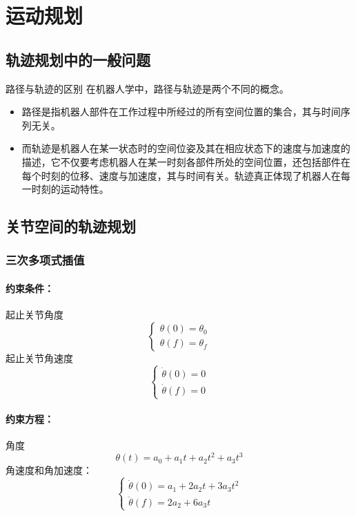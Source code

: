 \chapter{运动规划}
\label{sec:06-motion-planning}

\section{轨迹规划中的一般问题}
路径与轨迹的区别
在机器人学中，路径与轨迹是两个不同的概念。
\begin{itemize}
    \item 路径是指机器人部件在工作过程中所经过的所有空间位置的集合，其与时间序列无关。
    \item 而轨迹是机器人在某一状态时的空间位姿及其在相应状态下的速度与加速度的描述，它不仅要考虑机器人在某一时刻各部件所处的空间位置，还包括部件在每个时刻的位移、速度与加速度，其与时间有关。轨迹真正体现了机器人在每一时刻的运动特性。
\end{itemize}

\section{关节空间的轨迹规划}
\subsection{三次多项式插值}

\subsubsection{约束条件：}
起止关节角度
$$
\begin{cases} 
\theta(0) = \theta_0 \\ 
\theta(f) = \theta_f 
\end{cases}
$$
起止关节角速度
$$
\begin{cases} 
\dot{\theta}(0) = 0 \\ 
\dot{\theta}(f) = 0
\end{cases}
$$

\subsubsection{约束方程：}
角度
$$
\theta(t) = a_0 + a_1t + a_2t^2 + a_3t^3
$$
角速度和角加速度：
$$
\begin{cases} 
\dot{\theta}(0) = a_1 + 2a_2t + 3a_3t^2 \\ 
\ddot{\theta}(f) = 2a_2 + 6a_3t
\end{cases}
$$

